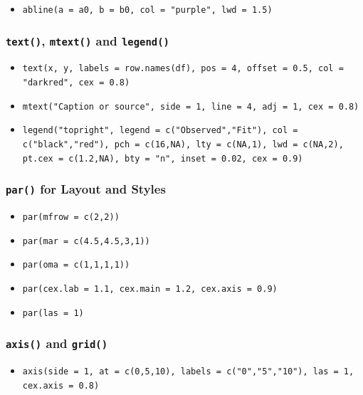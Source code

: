 \documentclass[11pt]{article}
\begin{document}
\begin{itemize}
\begin{itemize}
  \item \texttt{abline(a = a0, b = b0,  %
        col = "purple", lwd = 1.5)}
\end{itemize}

\subsubsection*{\texttt{text()}, \texttt{mtext()} and \texttt{legend()}}
\begin{itemize}
  \item \texttt{text(x, y,
        labels = row.names(df),
        pos    = 4,       %
        offset = 0.5,
        col    = "darkred",
        cex    = 0.8)}

  \item \texttt{mtext("Caption or source", 
        side = 1,        %
        line = 4,        %
        adj  = 1,        %
        cex  = 0.8)}

  \item \texttt{legend("topright",
        legend = c("Observed","Fit"),
        col    = c("black","red"),
        pch    = c(16,NA),
        lty    = c(NA,1),
        lwd    = c(NA,2),
        pt.cex = c(1.2,NA),
        bty    = "n",    %
        inset  = 0.02,
        cex    = 0.9)}
\end{itemize}

\subsubsection*{\texttt{par()} for Layout and Styles}
\begin{itemize}
  \item \texttt{par(mfrow = c(2,2))}   %
  \item \texttt{par(mar = c(4.5,4.5,3,1))} %
  \item \texttt{par(oma = c(1,1,1,1))} %
  \item \texttt{par(cex.lab = 1.1,     %
                   cex.main = 1.2,    %
                   cex.axis = 0.9)}  %
  \item \texttt{par(las = 1)}          %
\end{itemize}

\subsubsection*{\texttt{axis()} and \texttt{grid()}}
\begin{itemize}
  \item \texttt{axis(side = 1,
        at     = c(0,5,10),
        labels = c("0","5","10"),
        las    = 1,
        cex.axis = 0.8)}


\end{itemize}
\end{itemize}
\end{document}
